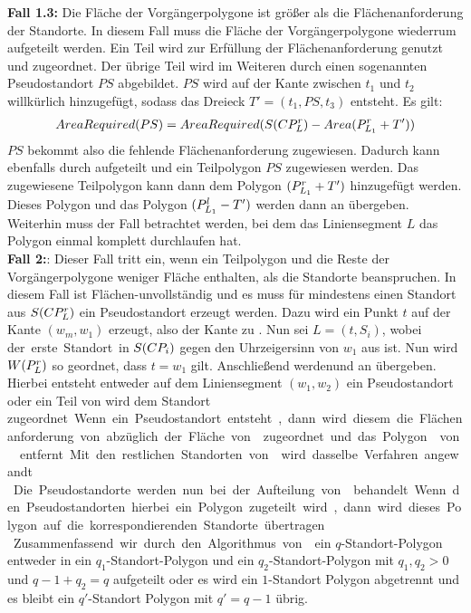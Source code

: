 \documentclass[ngerman]{seminarbeitrag}
\begin{document}
\textbf{Fall 1.3:} Die Fläche der Vorgängerpolygone ist größer als die Flächenanforderung der Standorte. In diesem Fall muss die Fläche der Vorgängerpolygone wiederrum aufgeteilt werden. Ein Teil wird zur Erfüllung der Flächenanforderung genutzt und \s{\mcprleins} zugeordnet. Der übrige Teil wird im Weiteren durch einen sogenannten Pseudostandort $PS$ abgebildet. $PS$ wird auf der Kante zwischen $t_{1}$ und $t_{2}$ willkürlich hinzugefügt, sodass das Dreieck $T' = (t_{1}, PS, t_{3})$ entsteht. Es gilt:
\begin{align*}AreaRequired(PS)=AreaRequired(S(CP_{L}^{r}) - Area(P_{L_{1}}^{r} + T')) \end{align*}
$PS$ bekommt also die fehlende Flächenanforderung zugewiesen. Dadurch kann  ebenfalls durch \noncon aufgeteilt und ein Teilpolygon $PS$ zugewiesen werden. Das zugewiesene Teilpolygon kann dann dem Polygon $(P_{L_{1}}^{r} + T')$ hinzugefügt werden. Dieses Polygon und das Polygon $(P_{L_{1}}^{l} -T')$ werden dann an \daa übergeben. \\

Weiterhin muss der Fall betrachtet werden, bei dem das Liniensegment $L$ das Polygon einmal komplett durchlaufen hat.\\
\textbf{Fall 2:}: Dieser Fall tritt ein, wenn ein Teilpolygon und die Reste der Vorgängerpolygone weniger Fläche enthalten, als die Standorte beanspruchen. In diesem Fall ist \cpi Flächen-unvollständig und es muss für mindestens einen Standort aus $S(CP_{L}^{r})$ ein Pseudostandort erzeugt werden. Dazu wird ein Punkt $t$ auf der Kante $(w_{m}, w_{1})$ erzeugt, also der Kante zu \next{\mcpi}. Nun sei $L = (t, S_{i})$, wobei \si der erste Standort in $S(CP_{i})$ gegen den Uhrzeigersinn von $w_{1}$ aus ist. Nun wird $W(P_{L}^{r})$ so geordnet, dass $t = w_{1}$ gilt. Anschließend werden\prl und \pll an \daa übergeben. Hierbei entsteht entweder auf dem Liniensegment $(w_{1}, w_{2})$ ein Pseudostandort oder ein Teil von \prl wird dem Standort \si zugeordnet. Wenn ein Pseudostandort entsteht, dann wird diesem die Flächenanforderung von \si abzüglich der Fläche von \prl zugeordnet und das Polygon \prl von \cpi entfernt. Mit den restlichen Standorten von \cpi wird dasselbe Verfahren angewandt.\\
Die Pseudostandorte werden nun bei der Aufteilung von \next{\mcpi} behandelt. Wenn den Pseudostandorten hierbei ein Polygon zugeteilt wird, dann wird dieses Polygon auf die korrespondierenden Standorte übertragen.\\
Zusammenfassend wir durch den Algorithmus von\noncon ein $q$-Standort-Polygon entweder in ein $q_{1}$-Standort-Polygon und ein $q_{2}$-Standort-Polygon mit $q_{1}, q_{2} > 0$ und $q-{1} + q_{2} = q$ aufgeteilt oder es wird ein $1$-Standort Polygon abgetrennt und es bleibt ein $q'$-Standort Polygon mit $q' = q - 1$ übrig.
\end{document}
